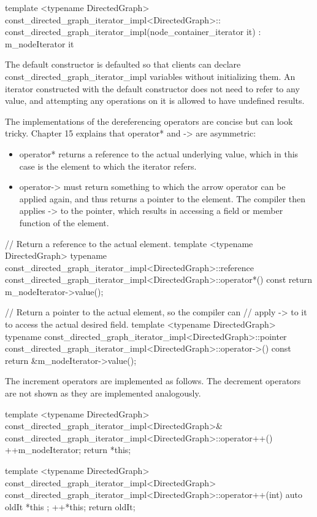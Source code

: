 \begin{cpp}
template <typename DirectedGraph>
const_directed_graph_iterator_impl<DirectedGraph>::
    const_directed_graph_iterator_impl(node_container_iterator it)
        : m_nodeIterator { it } { }
\end{cpp}

The default constructor is defaulted so that clients can declare const\_directed\_graph\_iterator\_impl variables without initializing them. An iterator constructed with the default constructor does not need to refer to any value, and attempting any operations on it is allowed to have undefined results.

The implementations of the dereferencing operators are concise but can look tricky. Chapter 15 explains that operator* and -> are asymmetric:

\begin{itemize}
\item
operator* returns a reference to the actual underlying value, which in this case is the element to which the iterator refers.

\item
operator-> must return something to which the arrow operator can be applied again, and thus returns a pointer to the element. The compiler then applies -> to the pointer, which results in accessing a field or member function of the element.
\end{itemize}

\begin{cpp}
// Return a reference to the actual element.
template <typename DirectedGraph>
typename const_directed_graph_iterator_impl<DirectedGraph>::reference
    const_directed_graph_iterator_impl<DirectedGraph>::operator*() const
{
    return m_nodeIterator->value();
}

// Return a pointer to the actual element, so the compiler can
// apply -> to it to access the actual desired field.
template <typename DirectedGraph>
typename const_directed_graph_iterator_impl<DirectedGraph>::pointer
    const_directed_graph_iterator_impl<DirectedGraph>::operator->() const
{
    return &m_nodeIterator->value();
}
\end{cpp}

The increment operators are implemented as follows. The decrement operators are not shown as they are implemented analogously.

\begin{cpp}
template <typename DirectedGraph>
const_directed_graph_iterator_impl<DirectedGraph>&
    const_directed_graph_iterator_impl<DirectedGraph>::operator++()
{
    ++m_nodeIterator;
    return *this;
}

template <typename DirectedGraph>
const_directed_graph_iterator_impl<DirectedGraph>
    const_directed_graph_iterator_impl<DirectedGraph>::operator++(int)
{
    auto oldIt { *this };
    ++*this;
    return oldIt;
}
\end{cpp}

